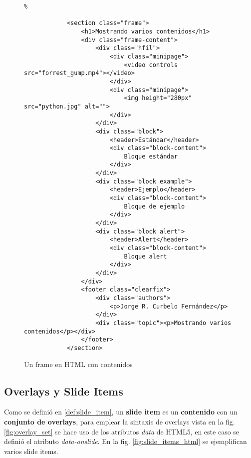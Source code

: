 				\begin{figure}[htb]%
					\begin{lstlisting}%

            <section class="frame">
                <h1>Mostrando varios contenidos</h1>
                <div class="frame-content">
                    <div class="hfil">
                        <div class="minipage">
                            <video controls src="forrest_gump.mp4"></video>
                        </div>
                        <div class="minipage">
                            <img height="280px" src="python.jpg" alt="">
                        </div>                        
                    </div>
                    <div class="block">
                        <header>Estándar</header>
                        <div class="block-content">
                            Bloque estándar
                        </div>
                    </div>
                    <div class="block example">
                        <header>Ejemplo</header>
                        <div class="block-content">
                            Bloque de ejemplo
                        </div>
                    </div>
                    <div class="block alert">
                        <header>Alert</header>
                        <div class="block-content">
                            Bloque alert
                        </div>
                    </div>                    
                </div>
                <footer class="clearfix">
                    <div class="authors">
                        <p>Jorge R. Curbelo Fernández</p>
                    </div>
                    <div class="topic"><p>Mostrando varios contenidos</p></div>
                </footer>                
            </section>
					\end{lstlisting}
					\caption{Un frame en HTML con contenidos}
					\label{fig:frames_html}
				\end{figure}	  
		

		\subsection{Overlays y Slide Items} %
		\label{sub:slide_items}
			Como se definió en \ref{def:slide_item}, un \textbf{slide item} es un \textbf{contenido} con un \textbf{conjunto de overlays}, para emplear la sintaxis de overlays vista en la fig. \ref{fig:overlay_set} se hace uso de los atributos \textit{data} de HTML5, en este caso se definió el atributo \textit{data-onslide}. En la fig. \ref{fig:slide_items_html} se ejemplifican varios slide items.

